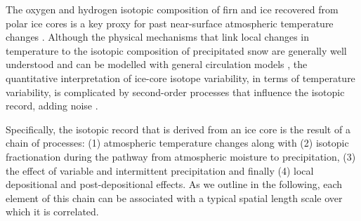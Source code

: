 \documentclass[cp, manuscript]{copernicus}
\begin{document}
\introduction

The oxygen and hydrogen isotopic composition of firn and ice recovered from
polar ice cores is a key proxy for past near-surface atmospheric temperature
changes \citep{Dansgaard1964,Lorius1969,Masson-Delmotte2008,Sjolte2011}.
Although the physical mechanisms that link local changes in temperature to the
isotopic composition of precipitated snow are generally well understood
\citep{Dansgaard1964,Craig1965,Jouzel1984} and can be modelled with general
circulation models
\citep{Joussaume1984,Werner2011,Werner2016,Sjolte2011,Goursaud2018}, the
quantitative interpretation of ice-core isotope variability, in terms of
temperature variability, is complicated by second-order processes that
influence the isotopic record, adding noise \citep{Munch2018a}.

Specifically, the isotopic record that is derived from an ice core is the result
of a chain of processes: (1) atmospheric temperature changes along with (2) isotopic
fractionation during the pathway from atmospheric moisture to precipitation, (3)
the effect of variable and intermittent precipitation and finally (4) local
depositional and post-depositional effects. As we outline in the following, each
element of this chain can be associated with a typical spatial length scale over
which it is correlated.
\end{document}
